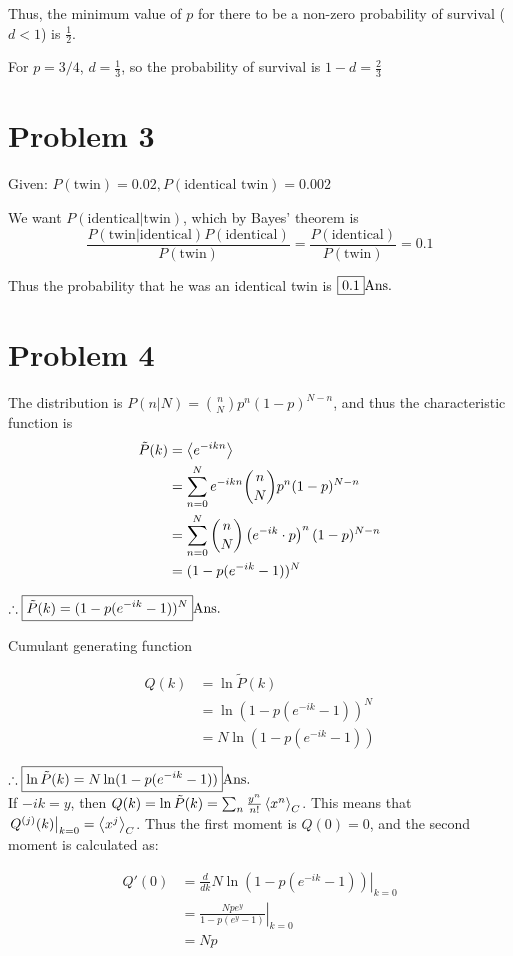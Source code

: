 \documentclass[12pt]{article}
\begin{document}
Thus, the minimum value of $p$ for there to be a non-zero probability of survival ($d<1$) is $\boxed{\frac12}$.

For $p=3/4$, $d=\frac13$, so the probability of survival is $1-d = \boxed{\frac23}$
\section*{Problem 3}
Given: $P(\text{twin}) = 0.02, P(\text{identical twin}) = 0.002$

We want $P(\text{identical}|\text{twin})$, which by Bayes' theorem is $$\frac{P(\text{twin}|\text{identical})P(\text{identical})}{P(\text{twin})}=\frac{P(\text{identical})}{P(\text{twin})}=0.1$$

Thus the probability that he was an identical twin is $\boxed{0.1}\hfill \text{Ans.}$

\section*{Problem 4}

The distribution is $P(n|N) = {n\choose N}p^n(1-p)^{N-n}$, and thus the characteristic function is 
\begin{align*}\tilde{P}(k) &= \Braket{e^{-ikn}}\\
&= \sum_{n=0}^N e^{-ikn}{n\choose N}p^n(1-p)^{N-n}\\
&= \sum_{n=0}^N {n\choose N}\left(e^{-ik}\cdot p\right)^n(1-p)^{N-n}\\
&= (1 - p(e^{-ik}-1))^N
\end{align*}

$\therefore \boxed{\tilde{P}(k) = (1 - p(e^{-ik}-1))^N}\hfill \text{Ans.}$

Cumulant generating function

\begin{align*}
Q(k) & = \ln\tilde{P}(k)\\
&= \ln (1 - p(e^{-ik}-1))^N\\
&= N \ln (1 - p(e^{-ik}-1))
\end{align*}

$\therefore \boxed{\ln\tilde{P}(k) = N\ln (1 - p(e^{-ik}-1))}\hfill \text{Ans.}$
~\\
If $-ik = y$, then $Q(k) = \ln\tilde{P}(k) = \sum_n \frac{y^n}{n!}\Braket{x^n}_C$. This means that $\left.Q^{(j)}(k)\right|_{k=0} = \Braket{x^j}_C$. Thus the first moment is $Q(0) = 0$, and the second moment is calculated as:

\begin{align*}
Q'(0) &= \left.\frac{d}{dk}N\ln (1 - p(e^{-ik}-1))\right|_{k=0}\\
&= \left.\frac{N p e^y}{1-p \left(e^y-1\right)}\right|_{k=0}\\
&= Np
\end{align*}
\end{document}
